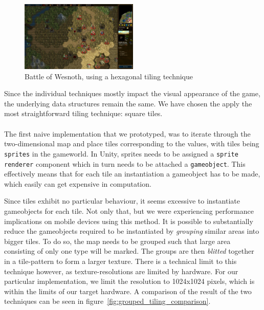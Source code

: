 \begin{figure}[H]
    \centering
    \includegraphics[width=0.5\textwidth]{figures/generating_levels/wesnoth_hex.png}
    \caption{Battle of Wesnoth, using a hexagonal tiling technique}\label{fig:wesnoth_hex} 
\end{figure}
Since the individual techniques mostly impact the visual appearance of the
game, the underlying data structures remain the same.  We have chosen the apply
the most straightforward tiling technique: square tiles.
\\
\\
The first naive implementation that we prototyped, was to iterate through the
two-dimensional map and place tiles corresponding to the values, with tiles
being \texttt{sprites} in the gameworld.  In Unity, sprites needs to be
assigned a \texttt{sprite renderer} component which in turn needs to be
attached a \texttt{gameobject}.  This effectively means that for each tile an
instantiation a gameobject has to be made, which easily can get expensive in
computation.

Since tiles exhibit no particular behaviour, it seems excessive to instantiate
gameobjects for each tile.  Not only that, but we were experiencing performance
implications on mobile devices using this method.  It is possible to
substantially reduce the gameobjects required to be instantiated by
\textit{grouping} similar areas into bigger tiles.  To do so, the map needs to
be grouped such that large area consisting of only one type will be marked.
The groups are then \textit{blitted} together in a tile-pattern to form a
larger texture.  There is a technical limit to this technique however, as
texture-resolutions are limited by hardware.  For our particular
implementation, we limit the resolution to 1024x1024 pixels, which is within
the limits of our target hardware.  A comparison of the result of the two
techniques can be seen in figure~\ref{fig:grouped_tiling_comparison}.

